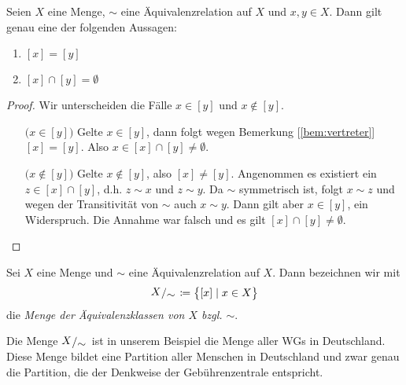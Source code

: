 \begin{bem}
\label{bem:disjunkt}

  Seien $X$ eine Menge, $\sim$ eine Äquivalenzrelation auf $X$ und $x,y\in
  X$. Dann gilt genau eine der folgenden Aussagen:

  \begin{enumerate}
    \item $[x] = [y]$
    \item $[x] \cap [y] = \emptyset$
  \end{enumerate}

  \begin{proof}

    Wir unterscheiden die Fälle $x\in [y]$ und $x\notin [y]$.
    \begin{itemize}

    \item[\tiny{$\big(x\in {[y]}\big)$}] Gelte $x\in [y]$, dann folgt wegen
      Bemerkung [\ref{bem:vertreter}] $[x]=[y]$. Also $x\in [x] \cap [y]
      \neq \emptyset$.

    \item[\tiny{$\big(x\notin {[y]}\big)$}] Gelte $x\notin [y]$, also
      $[x]\neq [y]$. Angenommen es existiert ein $z\in [x]\cap [y]$,
      d.h. $z \sim x$ und $z \sim y$. Da $\sim$ symmetrisch ist, folgt
      $x\sim z$ und wegen der Transitivität von $\sim$ auch $x\sim y$. Dann
      gilt aber $x\in [y]$, ein Widerspruch. Die Annahme war falsch und es
      gilt $[x] \cap [y] \neq \emptyset$.

    \end{itemize}
    
  \end{proof}
  
\end{bem}


\begin{defin}

  Sei $X$ eine Menge und $\sim$ eine Äquivalenzrelation auf $X$. Dann bezeichnen
  wir mit
  \begin{align*}
    \quotspace{X}{\sim} \ceq \big\{ [x] \mid x\in X \big\}
  \end{align*}
  die \emph{Menge der Äquivalenzklassen von $X$ bzgl. $\sim$}.
  

\end{defin}


Die Menge $\quotspace{X}{\sim}$ ist in unserem Beispiel die Menge aller WGs
in Deutschland. Diese Menge bildet eine Partition aller Menschen in
Deutschland und zwar genau die Partition, die der Denkweise der
Gebührenzentrale entspricht.

